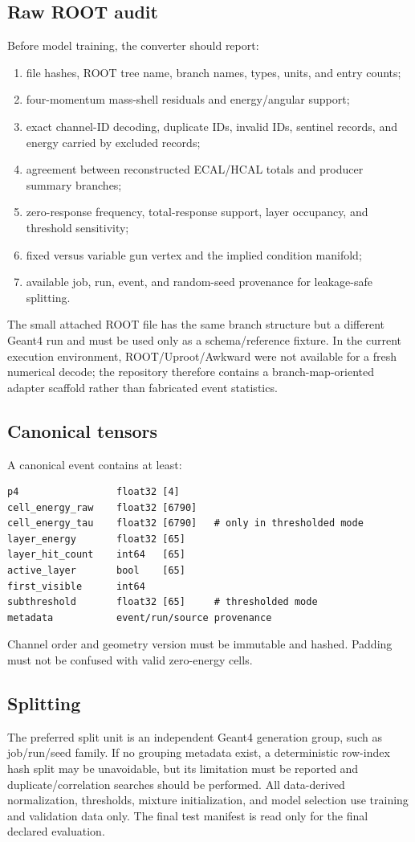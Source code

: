 \documentclass[11pt]{article}
\theoremstyle{definition}
\theoremstyle{remark}
\begin{document}
\subsection{Raw ROOT audit}
Before model training, the converter should report:
\begin{enumerate}[leftmargin=2em]
  \item file hashes, ROOT tree name, branch names, types, units, and entry counts;
  \item four-momentum mass-shell residuals and energy/angular support;
  \item exact channel-ID decoding, duplicate IDs, invalid IDs, sentinel records, and energy carried by excluded records;
  \item agreement between reconstructed ECAL/HCAL totals and producer summary branches;
  \item zero-response frequency, total-response support, layer occupancy, and threshold sensitivity;
  \item fixed versus variable gun vertex and the implied condition manifold;
  \item available job, run, event, and random-seed provenance for leakage-safe splitting.
\end{enumerate}
The small attached ROOT file has the same branch structure but a different Geant4 run and must be used only as a schema/reference fixture. In the current execution environment, ROOT/Uproot/Awkward were not available for a fresh numerical decode; the repository therefore contains a branch-map-oriented adapter scaffold rather than fabricated event statistics.

\subsection{Canonical tensors}
A canonical event contains at least:
\begin{lstlisting}
p4                 float32 [4]
cell_energy_raw    float32 [6790]
cell_energy_tau    float32 [6790]   # only in thresholded mode
layer_energy       float32 [65]
layer_hit_count    int64   [65]
active_layer       bool    [65]
first_visible      int64
subthreshold       float32 [65]     # thresholded mode
metadata           event/run/source provenance
\end{lstlisting}
Channel order and geometry version must be immutable and hashed. Padding must not be confused with valid zero-energy cells.

\subsection{Splitting}
The preferred split unit is an independent Geant4 generation group, such as job/run/seed family. If no grouping metadata exist, a deterministic row-index hash split may be unavoidable, but its limitation must be reported and duplicate/correlation searches should be performed. All data-derived normalization, thresholds, mixture initialization, and model selection use training and validation data only. The final test manifest is read only for the final declared evaluation.
\end{document}
